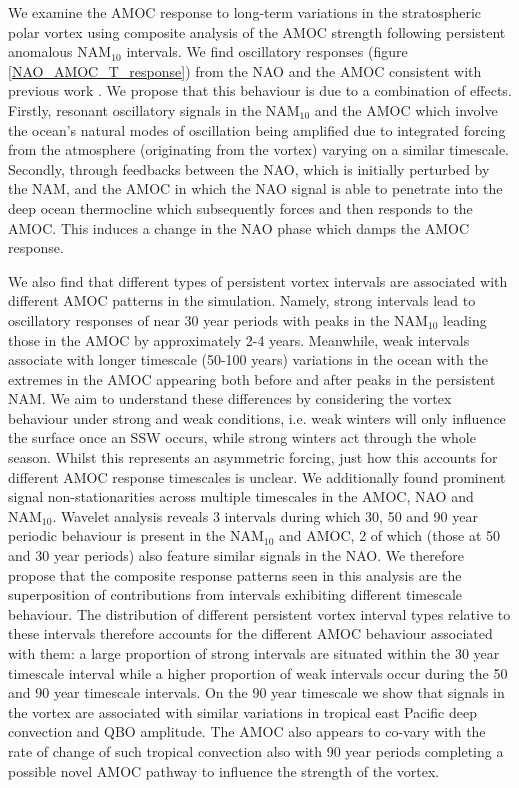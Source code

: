 We examine the AMOC response to long-term variations in the stratospheric polar vortex using composite analysis of the AMOC strength following persistent anomalous NAM$_{10}$ intervals. We find oscillatory responses (figure \ref{NAO_AMOC_T_response}) from the NAO and the AMOC consistent with previous work  \citep{reichlerStratospheric2012}. We propose that this behaviour is due to a combination of effects. Firstly, resonant oscillatory signals in the NAM$_{10}$ and the AMOC which involve the ocean's natural modes of oscillation being amplified due to integrated forcing from the atmosphere (originating from the vortex) varying on a similar timescale. Secondly, through feedbacks between the NAO, which is initially perturbed by the NAM, and the AMOC in which the NAO signal is able to penetrate into the deep ocean thermocline which subsequently forces and then responds to the AMOC. This induces a change in the NAO phase which damps the AMOC response.

We also find that different types of persistent vortex intervals are associated with different AMOC patterns in the simulation. Namely, strong intervals lead to oscillatory responses of near 30 year periods with peaks in the NAM$_{10}$ leading those in the AMOC by approximately 2-4 years. Meanwhile, weak intervals associate with longer timescale (50-100 years) variations in the ocean with the extremes in the AMOC appearing both before and after peaks in the persistent NAM. We aim to understand these differences by considering the vortex behaviour under strong and weak conditions, i.e. weak winters will only influence the surface once an SSW occurs, while strong winters act through the whole season. Whilst this represents an asymmetric forcing, just how this accounts for different AMOC response timescales is unclear. We additionally found prominent signal non-stationarities across multiple timescales in the AMOC, NAO and NAM$_{10}$. Wavelet analysis reveals 3 intervals during which 30, 50 and 90 year periodic behaviour is present in the NAM$_{10}$ and AMOC, 2 of which (those at 50 and 30 year periods) also feature similar signals in the NAO. We therefore propose that the composite response patterns seen in this analysis are the superposition of contributions from intervals exhibiting different timescale behaviour. The distribution of different persistent vortex interval types relative to these intervals therefore accounts for the different AMOC behaviour associated with them: a large proportion of strong intervals are situated within the 30 year timescale interval while a higher proportion of weak intervals occur during the 50 and 90 year timescale intervals. On the 90 year timescale we show that signals in the vortex are associated with similar variations in tropical east Pacific deep convection and QBO amplitude. The AMOC also appears to co-vary with the rate of change of such tropical convection also with 90 year periods completing a possible novel AMOC pathway to influence the strength of the vortex.

